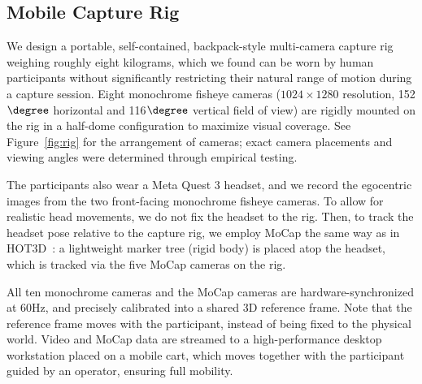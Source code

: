 \documentclass[10pt,twocolumn,letterpaper]{article}
\begin{document}
\subsection{Mobile Capture Rig}

We design a portable, self-contained, backpack-style multi-camera capture rig weighing roughly eight kilograms, which we found can be worn by human participants without significantly restricting their natural range of motion during a capture session.
Eight monochrome fisheye cameras ($1024\times1280$ resolution,  152$\degree$ horizontal and 116$\degree$ vertical field of view) are rigidly mounted on the rig in a half-dome configuration to maximize visual coverage.
See Figure~\ref{fig:rig} for the arrangement of cameras; exact camera placements and viewing angles were determined through empirical testing.

The participants also wear a Meta Quest 3 headset, and we record the egocentric images from the two front-facing monochrome fisheye cameras.
To allow for realistic head movements, we do not fix the headset to the rig.
Then, to track the headset pose relative to the capture rig, we employ MoCap the same way as in HOT3D~\cite{banerjee2025hot3d}: a lightweight marker tree (rigid body) is placed atop the headset, which is tracked via the five MoCap cameras on the rig. 


All ten monochrome cameras and the MoCap cameras are hardware-synchronized at 60Hz, and precisely calibrated into a shared 3D reference frame. 
Note that the reference frame moves with the participant, instead of being fixed to the physical world.
Video and MoCap data are streamed to a high-performance desktop workstation placed on a mobile cart, which moves together with the participant guided by an operator, ensuring full mobility.
\end{document}
